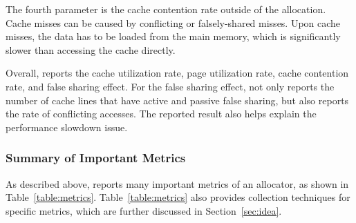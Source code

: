 The fourth parameter is the cache contention rate outside of the allocation. Cache misses can be caused by conflicting or falsely-shared misses. Upon cache misses, the data has to be loaded from the main memory, which is significantly slower than accessing the cache directly. 

Overall, \MP{} reports the cache utilization rate, page utilization rate, cache contention rate, and false sharing effect. For the false sharing effect, \MP{} not only reports the number of cache lines that have active and passive false sharing, but also reports the rate of conflicting accesses. The reported result also helps explain the performance slowdown issue. 

\subsubsection{Summary of Important Metrics}

As described above, \MP{} reports many important metrics of an allocator, as shown in Table~\ref{table:metrics}. 
Table~\ref{table:metrics} also provides collection techniques for specific metrics, which are further discussed in Section~\ref{sec:idea}. 

